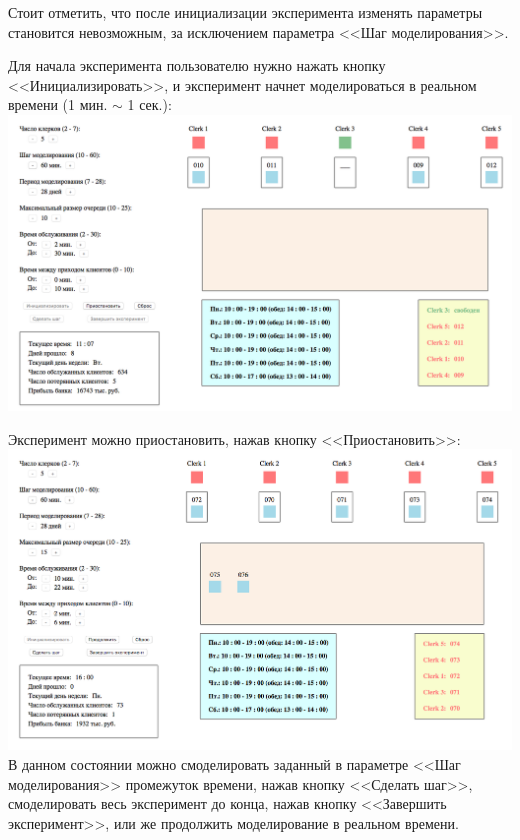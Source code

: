 \documentclass[oneside,final,12pt]{article}
\begin{document}
 Стоит отметить, что после инициализации эксперимента изменять параметры становится невозможным, за исключением параметра <<Шаг моделирования>>.\\
 
 \clearpage
 
 Для начала эксперимента пользователю нужно нажать кнопку <<Инициализировать>>, и эксперимент начнет моделироваться в реальном времени (1 мин. $\sim$ 1 сек.):\\
 
 \includegraphics[width=150mm]{processing.png}\\

 \clearpage
 
Эксперимент можно приостановить, нажав кнопку <<Приостановить>>:\\

 \includegraphics[width=150mm]{paused.png}\\

В данном состоянии можно смоделировать заданный в параметре <<Шаг моделирования>> промежуток времени, нажав кнопку <<Сделать шаг>>, смоделировать весь эксперимент до конца, нажав кнопку <<Завершить эксперимент>>, или же продолжить моделирование в реальном времени.\\
\end{document}
